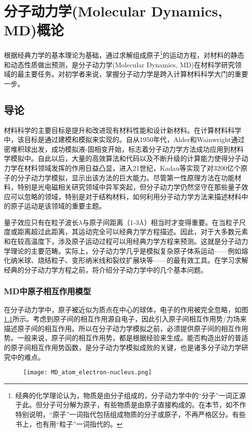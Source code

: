 \chapter{分子动力学\rm{(Molecular Dynamics, MD)}概论}\label{chapter:MD}
根据经典力学的基本理论为基础，通过求解组成原子\footnote{经典的化学理论认为，物质是由分子组成的，分子动力学中的“分子”一词正源于此。但分子可分解为原子，有些物质是由原子直接构成的。在本节，如不作特别说明，“原子”一词指代包括组成物质的分子或原子，不再严格区分。有些书上，也有用“粒子”一词指代的。}的运动方程，对材料的静态和动态性质做出预测，是分子动力学\textrm{(Molecular Dynamics, MD)}在材料学研究领域的最主要任务。对初学者来说，掌握分子动力学是跨入计算材料科学大门的重要一步。

\section{导论}
材料科学的主要目标是提升和改进现有材料性能和设计新材料。在计算材料科学中，该目标是通过建模和模拟来实现的。自从1950年代，\textrm{Alder}和\textrm{Wainwright}通过密堆积球出发，成功模拟液-固相变\cite{JCP27-1208_1957}开始，标志着分子动力学方法成功应用到材料学模拟中。自此以后，大量的高效算法和代码以及不断升级的计算能力使得分子动力学在材料领域发挥的作用日益凸显，进入21世纪，\textrm{Kadau}等实现了对3200亿个原子的分子动力学模拟\cite{IJMPC17-1755_2006}，显示出该方法的巨大能力。尽管第一性原理方法在功能材料，特别是光电磁相关研究领域中异军突起，但分子动力学仍然坚守在那些量子效应可以忽略的领域，特别是对于结构材料，如何利用分子动力学方法来描述材料中的原子运动是该领域的重要主题。

量子效应只有在粒子波长$\lambda$与原子间距离（1-3\AA）相当时才变得重要。在当粒子尺度或距离超过此距离，其运动完全可以经典力学方程描述。因此，对于大多数元素和在较高温度下，涉及原子运动过程可以用经典力学方程来预测。这就是分子动力学理论的主要范畴。实际上，分子动力学几乎是模拟复杂原子体系运动——例如熔化纳米球、烧结粒子、变形纳米线和裂纹扩展块等——的最有效工具。在学习求解经典的分子动力学方程之前，将介绍分子动力学中的几个基本问题。

\subsection{\rm{MD}中原子相互作用模型}
在分子动力学中，原子被近似为质点在中心的球体，电子的作用被完全忽略，如图\ref{MD_atoms}所示。考虑到原子间的相互作用源自电子，因此引入原子间相互作用势/力场来描述原子间的相互作用。所以在分子动力学模拟之前，必须提供原子间的相互作用势。一般来说，原子间的相互作用势，都是根据经验来生成。能否构造出好的普适的原子间相互作用势函数，是分子动力学模拟成败的关键，也是诸多分子动力学研究中的难点。
\begin{figure}[h!]
\centering
\vspace*{-0.1in}
\texttt{[image: MD\_atom\_electron-nucleus.png]}
\caption{\fontsize{7.2pt}{4.2pt}}%
\label{MD_atoms}
\end{figure}

